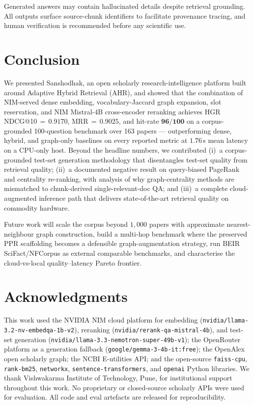 \documentclass[journal]{IEEEtran}
\begin{document}
Generated answers may contain hallucinated details despite
retrieval grounding. All outputs surface source-chunk identifiers
to facilitate provenance tracing, and human verification is
recommended before any scientific use.

\section{Conclusion}
\label{sec:conclusion}

We presented Sanshodhak, an open scholarly research-intelligence
platform built around Adaptive Hybrid Retrieval (AHR), and showed
that the combination of NIM-served dense embedding, vocabulary-Jaccard
graph expansion, slot reservation, and NIM Mistral-4B cross-encoder
reranking achieves HGR NDCG@10\,$=$\,$\mathbf{0.9170}$,
MRR\,$=$\,$\mathbf{0.9025}$, and hit-rate $\mathbf{96/100}$ on a
corpus-grounded 100-question benchmark over 163 papers — outperforming
dense, hybrid, and graph-only baselines on every reported metric at
$1.76$\,s mean latency on a CPU-only host. Beyond the headline
numbers, we contributed (i)~a corpus-grounded test-set generation
methodology that disentangles test-set quality from retrieval quality;
(ii)~a documented negative result on query-biased PageRank and
centrality re-ranking, with analysis of why graph-centrality methods
are mismatched to chunk-derived single-relevant-doc QA; and
(iii)~a complete cloud-augmented inference path that delivers
state-of-the-art retrieval quality on commodity hardware.

Future work will scale the corpus beyond $1{,}000$ papers with
approximate nearest-neighbour graph construction, build a
multi-hop benchmark where the preserved PPR scaffolding becomes a
defensible graph-augmentation strategy, run BEIR SciFact/NFCorpus as
external comparable benchmarks, and characterise the cloud-vs-local
quality--latency Pareto frontier.

\section*{Acknowledgments}

This work used the NVIDIA NIM cloud platform for embedding
(\texttt{nvidia/llama-3.2-nv-embedqa-1b-v2}), reranking
(\texttt{nvidia/rerank-qa-mistral-4b}), and test-set generation
(\texttt{nvidia/llama-3.3-nemotron-super-49b-v1}); the OpenRouter
platform as a generation fallback (\texttt{google/gemma-3-4b-it:free});
the OpenAlex open scholarly graph; the NCBI E-utilities API; and the
open-source \texttt{faiss-cpu}, \texttt{rank-bm25}, \texttt{networkx},
\texttt{sentence-transformers}, and \texttt{openai} Python libraries.
We thank Vishwakarma Institute of Technology, Pune, for institutional
support throughout this work. No proprietary or closed-source
scholarly APIs were used for evaluation. All code and eval artefacts
are released for reproducibility.

\balance


\end{document}

